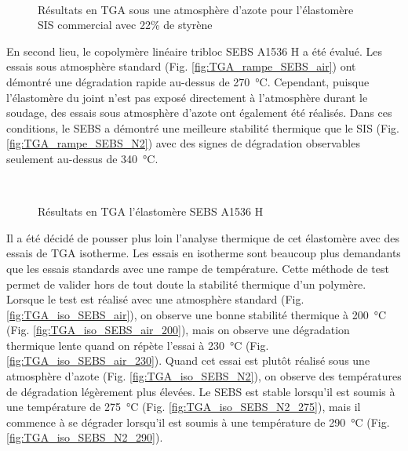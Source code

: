 \begin{figure}[h]
	\centering
	\\
	\caption{Résultats en TGA sous une atmosphère d'azote pour l'élastomère SIS commercial avec 22\% de styrène}
	\label{fig:TGA_SIS}
\end{figure}

\FloatBarrier
En second lieu, le copolymère linéaire tribloc SEBS A1536 H a été évalué. 
Les essais sous atmosphère standard (Fig. \ref{fig:TGA_rampe_SEBS_air}) ont démontré une dégradation rapide au-dessus de \SI{270}{\celsius}. 
Cependant, puisque l'élastomère du joint n'est pas exposé directement à l'atmosphère durant le soudage, des essais sous atmosphère d'azote ont également été réalisés. 
Dans ces conditions, le SEBS a démontré une meilleure stabilité thermique que le SIS (Fig. \ref{fig:TGA_rampe_SEBS_N2}) avec des signes de dégradation observables seulement au-dessus de \SI{340}{\celsius}. 

\begin{figure}[h]
	\centering
	\\
	\caption{Résultats en TGA l'élastomère SEBS A1536 H}
	\label{fig:TGA_rampe_SEBS}
\end{figure}

Il a été décidé de pousser plus loin l'analyse thermique de cet élastomère avec des essais de TGA isotherme. 
Les essais en isotherme sont beaucoup plus demandants que les essais standards avec une rampe de température. 
Cette méthode de test permet de valider hors de tout doute la stabilité thermique d'un polymère. 
Lorsque le test est réalisé avec une atmosphère standard (Fig. \ref{fig:TGA_iso_SEBS_air}), on observe une bonne stabilité thermique à \SI{200}{\celsius} (Fig. \ref{fig:TGA_iso_SEBS_air_200}), mais on observe une dégradation thermique lente quand on répète l'essai à \SI{230}{\celsius} (Fig. \ref{fig:TGA_iso_SEBS_air_230}). 
Quand cet essai est plutôt réalisé sous une atmosphère d'azote (Fig. \ref{fig:TGA_iso_SEBS_N2}), on observe des températures de dégradation légèrement plus élevées. 
Le SEBS est stable lorsqu'il est soumis à une température de \SI{275}{\celsius} (Fig. \ref{fig:TGA_iso_SEBS_N2_275}), mais il commence à se dégrader lorsqu'il est soumis à une température de \SI{290}{\celsius} (Fig. \ref{fig:TGA_iso_SEBS_N2_290}). 

